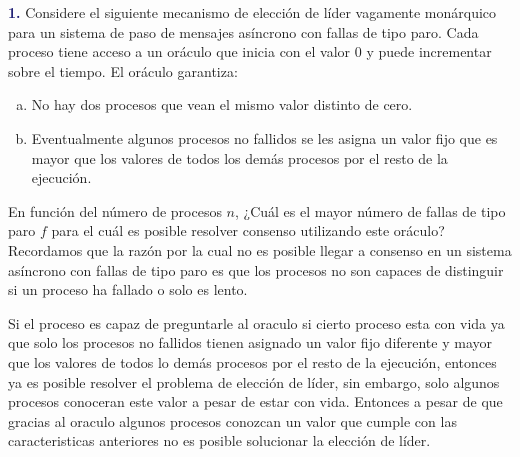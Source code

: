 \newpage\textbf{\textcolor{MidnightBlue}{1.}}
Considere el siguiente mecanismo de elección de líder vagamente monárquico para
un sistema de paso de mensajes asíncrono con fallas de tipo paro. Cada proceso tiene
acceso a un oráculo que inicia con el valor $0$ y puede incrementar sobre el tiempo.
El oráculo garantiza:
\begin{enumerate}[a)]
\item No hay dos procesos que vean el mismo valor distinto de cero.
\item Eventualmente algunos procesos no fallidos se les asigna un valor fijo que es
mayor que los valores de todos los demás procesos por el resto de la ejecución.
\end{enumerate}

En función del número de procesos $n$, ¿Cuál es el mayor número 
de fallas de tipo paro $f$ para el cuál es posible resolver consenso utilizando este oráculo?\\

Recordamos que la razón por la cual no es posible llegar a consenso 
en un sistema asíncrono con fallas de tipo paro es que los 
procesos no son capaces de  distinguir si un proceso ha fallado o 
solo es lento.

Si el proceso es capaz de preguntarle al oraculo si cierto proceso esta con 
vida ya que solo los procesos no fallidos tienen asignado un valor fijo 
diferente y mayor que los valores de todos lo demás procesos por el resto de la 
ejecución, entonces ya es posible resolver el problema de elección de líder,
sin embargo, solo algunos procesos conoceran este valor a pesar de estar con 
vida. Entonces a pesar de que gracias al oraculo algunos procesos conozcan un 
valor que cumple con las caracteristicas anteriores no es posible
solucionar la elección de líder.
